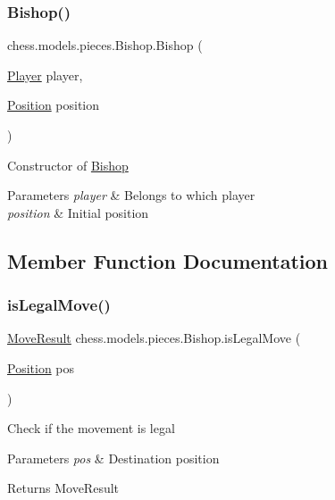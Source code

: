\subsubsection{\texorpdfstring{Bishop()}{Bishop()}}
{\footnotesize\ttfamily chess.\+models.\+pieces.\+Bishop.\+Bishop (\begin{DoxyParamCaption}\item[{\mbox{\hyperlink{enumchess_1_1models_1_1enums_1_1_player}{Player}}}]{player,  }\item[{\mbox{\hyperlink{classchess_1_1models_1_1_position}{Position}}}]{position }\end{DoxyParamCaption})}

Constructor of \mbox{\hyperlink{classchess_1_1models_1_1pieces_1_1_bishop}{Bishop}}


\begin{DoxyParams}{Parameters}
{\em player} & Belongs to which player \\
\hline
{\em position} & Initial position \\
\hline
\end{DoxyParams}


\subsection{Member Function Documentation}
\mbox{\label{classchess_1_1models_1_1pieces_1_1_bishop_ae5a545cda22d44b4c4cbfeebab5c0853}} 
\subsubsection{\texorpdfstring{is\+Legal\+Move()}{isLegalMove()}}
{\footnotesize\ttfamily \mbox{\hyperlink{enumchess_1_1models_1_1enums_1_1_move_result}{Move\+Result}} chess.\+models.\+pieces.\+Bishop.\+is\+Legal\+Move (\begin{DoxyParamCaption}\item[{\mbox{\hyperlink{classchess_1_1models_1_1_position}{Position}}}]{pos }\end{DoxyParamCaption})}

Check if the movement is legal


\begin{DoxyParams}{Parameters}
{\em pos} & Destination position \\
\hline
\end{DoxyParams}
\begin{DoxyReturn}{Returns}
Move\+Result 
\end{DoxyReturn}
\mbox{\label{classchess_1_1models_1_1pieces_1_1_bishop_abbdf19ca47acb189eeaa49931eb2f30c}} 
